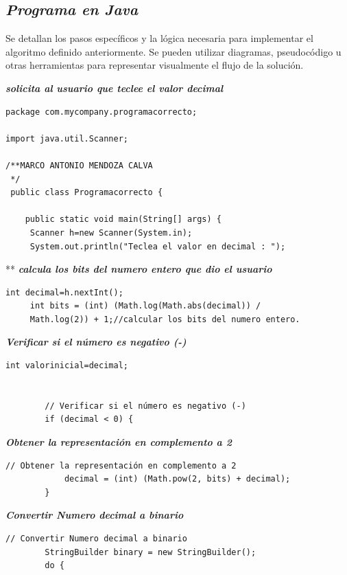 \subsection{\textbf{\textit{Programa en Java}}}
Se detallan los pasos específicos y la lógica necesaria para implementar el algoritmo definido anteriormente. Se pueden utilizar diagramas, pseudocódigo u otras herramientas para representar visualmente el flujo de la solución.

\subsectionse \textit{\textbf{solicita al usuario que teclee el valor decimal}}

\begin{lstlisting}[style=javaStyle]
package com.mycompany.programacorrecto;

import java.util.Scanner;

/**MARCO ANTONIO MENDOZA CALVA
 */
 public class Programacorrecto {

    public static void main(String[] args) {
     Scanner h=new Scanner(System.in);
     System.out.println("Teclea el valor en decimal : ");
\end{lstlisting}
**
\subsectionse\textbf{\textit{calcula los bits del numero entero que dio el usuario}}

\begin{lstlisting}[style=javaStyle]
int decimal=h.nextInt();
     int bits = (int) (Math.log(Math.abs(decimal)) / 
     Math.log(2)) + 1;//calcular los bits del numero entero.
\end{lstlisting}

\subsectionse\textbf{\textit{Verificar si el número es negativo (-)}}

\begin{lstlisting}[style=javaStyle]
        int valorinicial=decimal;    
    
       
        // Verificar si el número es negativo (-)
        if (decimal < 0) {
\end{lstlisting}

\subsectionse\textbf{\textit{Obtener la representación en complemento a 2}}

\begin{lstlisting}[style=javaStyle]
  // Obtener la representación en complemento a 2
            decimal = (int) (Math.pow(2, bits) + decimal);
        }
\end{lstlisting}
\subsectionse\textbf{\textit{Convertir Numero decimal a binario}}

\begin{lstlisting}[style=javaStyle]
  // Convertir Numero decimal a binario
        StringBuilder binary = new StringBuilder();
        do {
\end{lstlisting}


